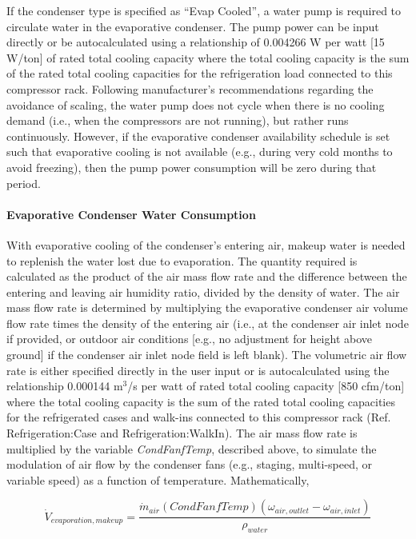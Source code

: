 If the condenser type is specified as ``Evap Cooled'', a water pump is required to circulate water in the evaporative condenser. The pump power can be input directly or be autocalculated using a relationship of 0.004266 W per watt {[}15 W/ton{]} of rated total cooling capacity where the total cooling capacity is the sum of the rated total cooling capacities for the refrigeration load connected to this compressor rack. Following manufacturer's recommendations regarding the avoidance of scaling, the water pump does not cycle when there is no cooling demand (i.e., when the compressors are not running), but rather runs continuously. However, if the evaporative condenser availability schedule is set such that evaporative cooling is not available (e.g., during very cold months to avoid freezing), then the pump power consumption will be zero during that period.

\paragraph{Evaporative Condenser Water Consumption}\label{evaporative-condenser-water-consumption}

With evaporative cooling of the condenser's entering air, makeup water is needed to replenish the water lost due to evaporation. The quantity required is calculated as the product of the air mass flow rate and the difference between the entering and leaving air humidity ratio, divided by the density of water. The air mass flow rate is determined by multiplying the evaporative condenser air volume flow rate times the density of the entering air (i.e., at the condenser air inlet node if provided, or outdoor air conditions {[}e.g., no adjustment for height above ground{]} if the condenser air inlet node field is left blank). The volumetric air flow rate is either specified directly in the user input or is autocalculated using the relationship 0.000144 m\(^{3}\)/s per watt of rated total cooling capacity {[}850 cfm/ton{]} where the total cooling capacity is the sum of the rated total cooling capacities for the refrigerated cases and walk-ins connected to this compressor rack (Ref. Refrigeration:Case and Refrigeration:WalkIn). The air mass flow rate is multiplied by the variable \emph{CondFanfTemp}, described above, to simulate the modulation of air flow by the condenser fans (e.g., staging, multi-speed, or variable speed) as a function of temperature. Mathematically,

\begin{equation}
{\dot V_{evaporation,makeup}} = \frac{{{{\dot m}_{air}}\left( {CondFanfTemp} \right)({\omega_{air,outlet}} - {\omega_{air,inlet}})}}{{{\rho_{water}}}}
\end{equation}

